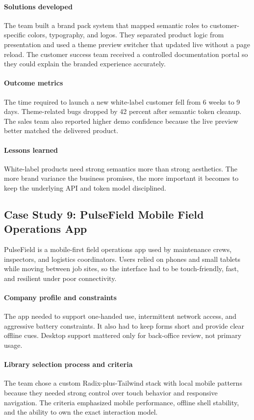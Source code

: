 \paragraph{Solutions developed}
The team built a brand pack system that mapped semantic roles to customer-specific colors, typography, and logos. They separated product logic from presentation and used a theme preview switcher that updated live without a page reload. The customer success team received a controlled documentation portal so they could explain the branded experience accurately.

\paragraph{Outcome metrics}
The time required to launch a new white-label customer fell from 6 weeks to 9 days. Theme-related bugs dropped by 42 percent after semantic token cleanup. The sales team also reported higher demo confidence because the live preview better matched the delivered product.

\paragraph{Lessons learned}
White-label products need strong semantics more than strong aesthetics. The more brand variance the business promises, the more important it becomes to keep the underlying API and token model disciplined.

\subsection{Case Study 9: PulseField Mobile Field Operations App}
PulseField is a mobile-first field operations app used by maintenance crews, inspectors, and logistics coordinators. Users relied on phones and small tablets while moving between job sites, so the interface had to be touch-friendly, fast, and resilient under poor connectivity.

\paragraph{Company profile and constraints}
The app needed to support one-handed use, intermittent network access, and aggressive battery constraints. It also had to keep forms short and provide clear offline cues. Desktop support mattered only for back-office review, not primary usage.

\paragraph{Library selection process and criteria}
The team chose a custom Radix-plus-Tailwind stack with local mobile patterns because they needed strong control over touch behavior and responsive navigation. The criteria emphasized mobile performance, offline shell stability, and the ability to own the exact interaction model.

